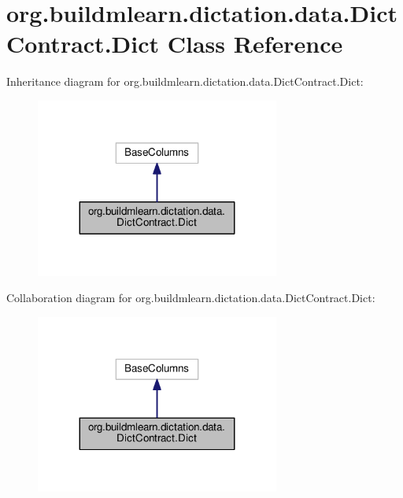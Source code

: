 \hypertarget{classorg_1_1buildmlearn_1_1dictation_1_1data_1_1DictContract_1_1Dict}{}\section{org.\+buildmlearn.\+dictation.\+data.\+Dict\+Contract.\+Dict Class Reference}
\label{classorg_1_1buildmlearn_1_1dictation_1_1data_1_1DictContract_1_1Dict}


Inheritance diagram for org.\+buildmlearn.\+dictation.\+data.\+Dict\+Contract.\+Dict\+:
\nopagebreak
\begin{figure}[H]
\begin{center}
\leavevmode
\includegraphics[width=227pt]{classorg_1_1buildmlearn_1_1dictation_1_1data_1_1DictContract_1_1Dict__inherit__graph}
\end{center}
\end{figure}


Collaboration diagram for org.\+buildmlearn.\+dictation.\+data.\+Dict\+Contract.\+Dict\+:
\nopagebreak
\begin{figure}[H]
\begin{center}
\leavevmode
\includegraphics[width=227pt]{classorg_1_1buildmlearn_1_1dictation_1_1data_1_1DictContract_1_1Dict__coll__graph}
\end{center}
\end{figure}
